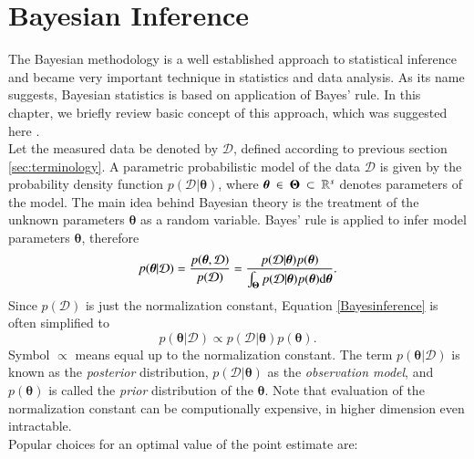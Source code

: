 \section{Bayesian Inference}
The Bayesian methodology is a well established approach to statistical inference and became very important technique in statistics and data analysis. As its name suggests, Bayesian statistics is based on application of Bayes' rule. In this chapter, we briefly review basic concept of this approach, which was suggested here \cite{smidl}. \\
 Let the measured data be denoted by $\mathcal{D}$, defined according to previous section \ref{sec:terminology}. A parametric probabilistic model of the data $\mathcal{D}$ is given by the probability density function  $p(\mathcal{D}|\boldsymbol{\theta})$, where $\boldsymbol{\theta}~\in~\boldsymbol{\Theta}~\subset~\mathbb{R}^s$ denotes parameters of the model. The main idea behind Bayesian theory is the treatment of the unknown parameters $\boldsymbol{\theta}$ as a random variable.  Bayes' rule is applied to infer model parameters $\boldsymbol{\theta}$, therefore
 \begin{equation}\label{Bayesinference}
 	p(\boldsymbol{\theta} | \mathcal{D}) = \frac{p(\boldsymbol{\theta}, \mathcal{D})}{p(\mathcal{D})} = \frac{p(\mathcal{D}| \boldsymbol{\theta})p(\boldsymbol{\theta})}{\int_{\boldsymbol{\Theta}}p(\mathcal{D}|\boldsymbol{\theta})p(\boldsymbol{\theta})\mathrm{d}\boldsymbol{\theta}}.
 \end{equation} 
Since $p(\mathcal{D})$ is just the normalization constant, Equation \eqref{Bayesinference} is often simplified to
\begin{equation}
	p(\boldsymbol{\theta} | \mathcal{D}) \propto p(\mathcal{D}| \boldsymbol{\theta})p(\boldsymbol{\theta}).
\end{equation} 
Symbol $\propto$ means equal up to the normalization constant. The term $p(\boldsymbol{\theta} | \mathcal{D})$ is known as the \emph{posterior} distribution, $p(\mathcal{D}| \boldsymbol{\theta})$  as the \emph{observation model}, and $p(\boldsymbol{\theta})$ is called the \emph{prior} distribution of the $\boldsymbol{\theta}$. Note that evaluation of the normalization constant can be computionally expensive, in higher dimension even intractable. \\
Popular choices for an optimal value of the point estimate are:
